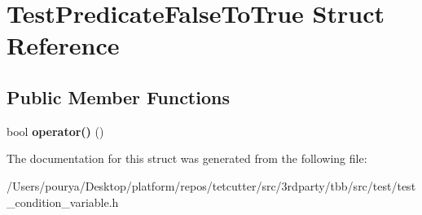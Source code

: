 \hypertarget{structTestPredicateFalseToTrue}{}\section{Test\+Predicate\+False\+To\+True Struct Reference}
\label{structTestPredicateFalseToTrue}
\subsection*{Public Member Functions}
\begin{DoxyCompactItemize}
\item 
\hypertarget{structTestPredicateFalseToTrue_a599d6781495545383d8f9a20606b5386}{}bool {\bfseries operator()} ()\label{structTestPredicateFalseToTrue_a599d6781495545383d8f9a20606b5386}

\end{DoxyCompactItemize}


The documentation for this struct was generated from the following file\+:\begin{DoxyCompactItemize}
\item 
/\+Users/pourya/\+Desktop/platform/repos/tetcutter/src/3rdparty/tbb/src/test/test\+\_\+condition\+\_\+variable.\+h\end{DoxyCompactItemize}

